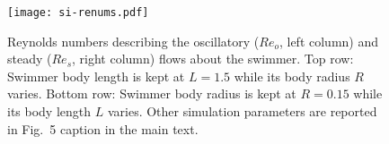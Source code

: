 \documentclass[times, 10pt]{article}
\newcommand{\Rey}{\textit{Re}}
\begin{document}
            \begin{figure}
                \centering
                \texttt{[image: si-renums.pdf]}
                \caption{Reynolds numbers describing the oscillatory ($\Rey_o$, left column) and steady ($\Rey_s$, right column) flows about the swimmer.
                Top row: Swimmer body length is kept at $L=1.5$ while its body radius $R$ varies.
                Bottom row: Swimmer body radius is kept at $R=0.15$ while its body length $L$ varies.
                Other simulation parameters are reported in Fig.~5 caption in the main text.
                }
                \label{fig:renums}
            \end{figure}

\FloatBarrier
\renewcommand\refname{Supplmentary Information References}


\end{document}
